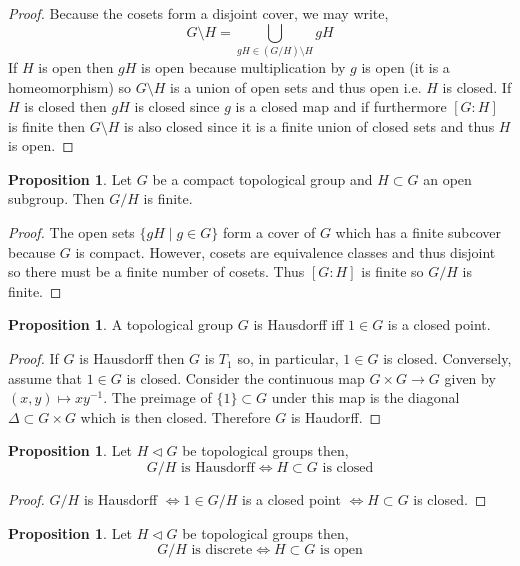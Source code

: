 \documentclass[12pt]{article}
\theoremstyle{remark}
\theoremstyle{definition}
\newtheorem{proposition}[theorem]{Proposition}
\begin{document}
\begin{proof}
Because the cosets form a disjoint cover, we may write,
\[ G \setminus H = \bigcup_{g H \in (G / H) \setminus H} g H \]
If $H$ is open then $g H$ is open because multiplication by $g$ is open (it is a homeomorphism) so $G \setminus H$ is a union of open sets and thus open i.e. $H$ is closed. If $H$ is closed then $g H$ is closed since $g$ is a closed map and if furthermore $[G : H]$ is finite then $G \setminus H$ is also closed since it is a finite union of closed sets and thus $H$ is open. 
\end{proof}

\begin{proposition}
Let $G$ be a compact topological group and $H \subset G$ an open subgroup. Then $G / H$ is finite.
\end{proposition}

\begin{proof}
The open sets $\{ g H \mid g \in G \}$ form a cover of $G$ which has a finite subcover because $G$ is compact. However, cosets are equivalence classes and thus disjoint so there must be a finite number of cosets. Thus $[G : H]$ is finite so $G / H$ is finite.  
\end{proof}

\begin{proposition}
A topological group $G$ is Hausdorff iff $1 \in G$ is a closed point.
\end{proposition}

\begin{proof}
If $G$ is Hausdorff then $G$ is $T_1$ so, in particular, $1 \in G$ is closed. Conversely, assume that $1 \in G$ is closed. Consider the continuous map $G \times G \to G$ given by $(x, y) \mapsto x y^{-1}$. The preimage of $\{ 1 \} \subset G$ under this map is the diagonal $\Delta \subset G \times G$ which is then closed. Therefore $G$ is Haudorff. 
\end{proof}

\begin{proposition}
Let $H \triangleleft G$ be topological groups then,
\[ G / H \text{ is Hausdorff} \iff H \subset G \text{ is closed} \] 
\end{proposition}

\begin{proof}
$G / H$ is Hausdorff $\iff 1 \in G / H$ is a closed point $\iff H \subset G$ is closed. 
\end{proof}

\begin{proposition}
Let $H \triangleleft G$ be topological groups then,
\[ G / H \text{ is discrete} \iff H \subset G \text{ is open} \] 
\end{proposition}
\end{document}
